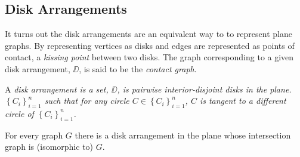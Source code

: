 \subsection{Disk Arrangements}
It turns out the disk arrangements are an equivalent way to to represent plane graphs.  By 
representing vertices as disks and edges are represented as points of contact, a \textit{kissing 
point} between two disks.  The graph corresponding to a given disk arrangement, $\DD$, is said to 
be the \textit{contact graph}.  

A \it{disk arrangement} is a set, $\DD$, is pairwise interior-disjoint disks in the plane.
$\left\lbrace C_i \right\rbrace_{i = 1}^n $ such that for any circle $C \in \left\lbrace C_i 
\right\rbrace_{i = 1}^n$, $C$ is tangent to a different circle of $\left\lbrace C_i \right\rbrace_{i 
= 1}^n$. 
\begin{thm}\label{thm2-1}
For every graph $G$ there is a disk arrangement in the
plane whose intersection graph is (isomorphic to) $G$.
\end{thm}

